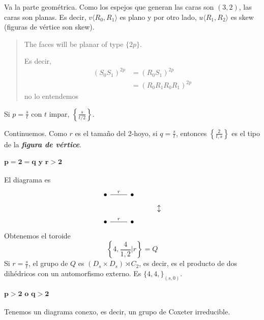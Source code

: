 \documentclass[spanish]{article}
\theoremstyle{definition}
\begin{document}
Va la parte geométrica. Como los espejos que generan las caras son $(3,2)$, las caras son planas. Es decir, $v\langle R_0,R_1\rangle$ es plano y por otro lado, $u\langle R_1,R_2\rangle$ es skew (figuras de vértice son skew).

\begin{quotation}
	{\color{blue}The faces will be planar of type $\{2p\}$.}
	
	Es decir, 
	\begin{align*}
		(S_0S_1)^{2p}&=(R_0S_1)^{2p}\\
		&=(R_0R_1R_0R_1)^{2p}
	\end{align*}
	{\color{cyan} no lo entendemos}
\end{quotation}
Si $p=\frac{s}{t}$ con $t$ impar, $\left\{\frac{s}{t/2}\right\}$.

Continuemos. Como $r$ es el tamaño del 2-hoyo, si $q=\frac{s}{t}$, entonces $\left\{\frac{2}{t,s}\right\}$ es el tipo de la \textbf{\textit{figura de vértice}}.

\paragraph{$\mathbf{p=2=q\text{ y }r>2}$}
El diagrama es
\[\begin{tikzcd}[row sep=tiny]
	\bullet\arrow[r,no head,"r"]&\bullet\\&&\updownarrow\\
		\bullet\arrow[r,no head,"r"]&\bullet
\end{tikzcd}\]
Obtenemos el toroide
\[\left\{4,\frac{4}{1,2}|r\right\}=Q\]
Si $r=\frac{s}{t}$, el grupo de $Q$ es $(D_s\times D_s)\rtimes C_2$, es decir, es el producto de dos dihédricos con un automorfismo externo. Es $\{4,4,\}_{(s,0)}$.

\paragraph{$\mathbf{p>2\text{ o }q>2}$} Tenemos un diagrama conexo, es decir, un grupo de Coxeter irreducible. 
\end{document}
